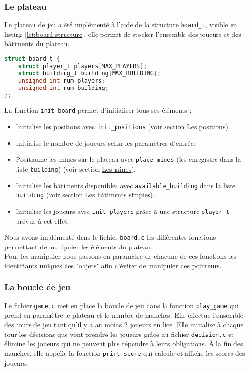 \subsubsection{Le plateau}
Le plateau de jeu a été implémenté à l'aide de la structure \texttt{board\_t}, visible en listing \ref{lst:board-structure}, elle permet de stocker l'ensemble des joueurs et des bâtiments du plateau.\\
\begin{lstlisting}[language=C, backgroundcolor=\color{black!5}, frame=single, frameround=tttt, basicstyle=\ttfamily, breaklines=true, keywordstyle=\color{blue}, commentstyle=\color{green!50!black}, stringstyle=\color{red},label={lst:board-structure}]
struct board_t {
    struct player_t players[MAX_PLAYERS];
    struct building_t building[MAX_BUILDING];
    unsigned int num_players;
    unsigned int num_building;
};
\end{lstlisting}
\vspace{-0.25cm}
\label{lst:board_structure}
\vspace{0.5cm}
La fonction \texttt{init\_board} permet d'initialiser tous ses éléments :
\begin{itemize}
    \setlength\itemsep{0.1em}
    \item Initialise les positions avec \texttt{init\_positions} (voir section \hyperref[sec:pos]{\uline{Les positions}}).
    \item Initialise le nombre de joueurs selon les paramètres d'entrée.
    \item Positionne les mines sur le plateau avec \texttt{place\_mines} (les enregistre dans la liste \texttt{building}) (voir section \hyperref[sec:mines]{\uline{Les mines}}).
    \item Initialise les bâtiments disponibles avec \texttt{available\_building} dans la liste \texttt{building} (voir section \hyperref[sec:bat]{\uline{Les bâtiments simples}}).
    \item Initialise les joueurs avec \texttt{init\_players} grâce à une structure \texttt{player\_t} prévue à cet effet.
\end{itemize}
Nous avons implémenté dans le fichier \texttt{board.c} les différentes fonctions permettant de manipuler les éléments du plateau.\\
Pour les manipuler nous passons en paramètre de chacune de ces fonctions les identifiants uniques des "objets" afin d'éviter de manipuler des pointeurs.

\subsubsection{La boucle de jeu}
Le fichier \texttt{game.c} met en place la boucle de jeu dans la fonction \texttt{play\_game} qui prend en paramètre le plateau et le nombre de manches. Elle effectue l'ensemble des tours de jeu tant qu'il y a au moins 2 joueurs en lice.
Elle initialise à chaque tour les décisions que vont prendre les joueurs grâce au fichier \texttt{decision.c} et élimine les joueurs qui ne peuvent plus répondre à leurs obligations. À la fin des manches, elle appelle la fonction \texttt{print\_score} qui calcule et affiche les scores des joueurs.

